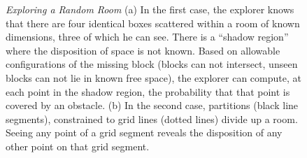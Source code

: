 \begin{figure}
\centering
{}
\caption{\emph{Exploring a Random Room}
(a) In the first case, the explorer knows that 
there are four identical boxes scattered within a
room of known dimensions, three of which he can see.
There is a ``shadow region'' where the disposition of 
space is not known.  Based on allowable configurations 
of the missing block (blocks can not intersect, 
unseen blocks can not lie in known free space), the
explorer can compute, at each point in the shadow region,
the probability that that point is covered by an obstacle.
(b) In the second case, partitions (black line segments),
constrained to grid lines (dotted lines)
divide up a room.  Seeing any point of a grid segment
reveals the disposition of any other point on that grid segment.
}
\end{figure}

